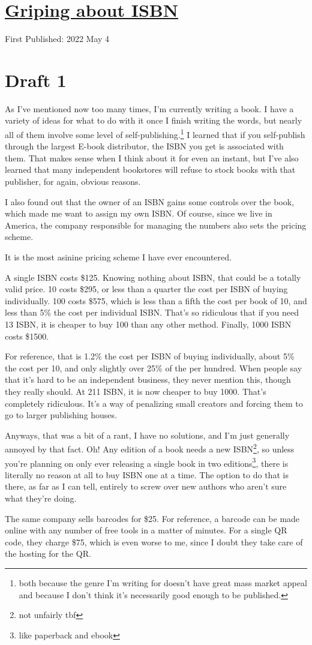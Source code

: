 \documentclass[12pt]{article}[titlepage]
\renewcommand{\,}{\textsuperscript{,}}
\begin{document}
\doublespacing
\section{\href{isbn-gripe.html}{Griping about ISBN}}
First Published: 2022 May 4

\section{Draft 1}
As I've mentioned now too many times, I'm currently writing a book.
I have a variety of ideas for what to do with it once I finish writing the words, but nearly all of them involve some level of self-publishing.\footnote{both because the genre I'm writing for doesn't have great mass market appeal and because I don't think it's necessarily good enough to be published.}
I learned that if you self-publish through the largest E-book distributor, the ISBN you get is associated with them.
That makes sense when I think about it for even an instant, but I've also learned that many independent bookstores will refuse to stock books with that publisher, for again, obvious reasons.

I also found out that the owner of an ISBN gains some controls over the book, which made me want to assign my own ISBN.
Of course, since we live in America, the company responsible for managing the numbers also sets the pricing scheme.

It is the most asinine pricing scheme I have ever encountered.

A single ISBN costs \$125.
Knowing nothing about ISBN, that could be a totally valid price.
10 costs \$295, or less than a quarter the cost per ISBN of buying individually.
100 costs \$575, which is less than a fifth the cost per book of 10, and less than 5\% the cost per individual ISBN.
That's so ridiculous that if you need 13 ISBN, it is cheaper to buy 100 than any other method.
Finally, 1000 ISBN costs \$1500.

For reference, that is 1.2\% the cost per ISBN of buying individually, about 5\% the cost per 10, and only slightly over 25\% of the per hundred.
When people say that it's hard to be an independent business, they never mention this, though they really should.
At 211 ISBN, it is now cheaper to buy 1000.
That's completely ridiculous.
It's a way of penalizing small creators and forcing them to go to larger publishing houses.

Anyways, that was a bit of a rant, I have no solutions, and I'm just generally annoyed by that fact.
Oh!
Any edition of a book needs a new ISBN\footnote{not unfairly tbf}, so unless you're planning on only ever releasing a single book in two editions\footnote{like paperback and ebook}, there is literally no reason at all to buy ISBN one at a time.
The option to do that is there, as far as I can tell, entirely to screw over new authors who aren't sure what they're doing.

The same company sells barcodes for \$25.
For reference, a barcode can be made online with any number of free tools in a matter of minutes.
For a single QR code, they charge \$75, which is even worse to me, since I doubt they take care of the hosting for the QR.
\end{document}
